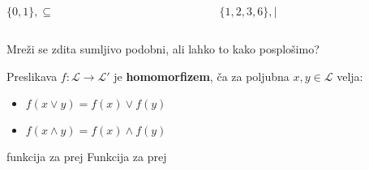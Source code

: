 \documentclass[slovene]{beamer}
\begin{document}
\begin{frame}
\begin{columns}
\begin{column}{5cm}
\begin{center}
$\{0,1\}, \subseteq$
\end{center}
\begin{figure}
\centering
{}
\end{figure}
\end{column}

\begin{column}{5cm}
\begin{center}
$\{1,2,3,6\}, |$
\end{center}
\begin{figure}
\centering
{}
\end{figure}
\end{column}
\end{columns}

\begin{block}{}
Mreži se zdita sumljivo podobni, ali lahko to kako posplošimo?
\end{block}

\end{frame}

\begin{frame}
\begin{definition}
Preslikava $f :\mathcal{L} \to \mathcal{L}'$ je \textbf{homomorfizem}, ča za poljubna $x,y \in \mathcal{L}$ velja:
\begin{itemize}
\item $f(x \lor y) = f(x) \lor f(y)$
\item $f(x \land y) = f(x) \land f(y)$
\end{itemize}
\end{definition}



\begin{block}{funkcija za prej}
Funkcija za prej 
\end{block}

\end{frame}
\end{document}
